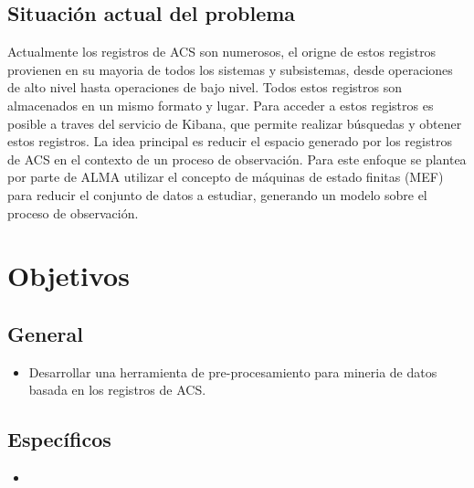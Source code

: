 \subsection{Situación actual del problema}
Actualmente los registros de ACS son numerosos, el origne de estos registros provienen en su mayoria de todos los sistemas y subsistemas, desde operaciones de alto nivel hasta operaciones de bajo nivel. Todos estos registros son almacenados en un mismo formato y lugar. Para acceder a estos registros es posible a traves del servicio de Kibana, que permite realizar búsquedas y obtener estos registros.
La idea principal es reducir el espacio generado por los registros de ACS en el contexto de un proceso de observación.
Para este enfoque se plantea por parte de ALMA utilizar el concepto de máquinas de estado finitas (MEF) para reducir el conjunto de datos a estudiar, generando un modelo sobre el proceso de observación. 
\section{Objetivos}
\subsection{General}
\begin{itemize}
	\item Desarrollar una herramienta de pre-procesamiento para mineria de datos basada en los registros de ACS.
\end{itemize}
\subsection{Específicos}
\begin{itemize}
	\item 
\end{itemize}